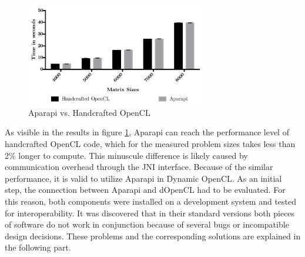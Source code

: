 \begin{figure}[H]
	\includegraphics[width=0.7\textwidth]{images/aparapivsopencl.pdf}
	\centering
	\caption{Aparapi vs. Handcrafted OpenCL}
	\label{img:aparapi_vs_opencl}
\end{figure}

As visible in the results in figure \ref{img:aparapi_vs_opencl}, Aparapi can reach the performance level of handcrafted OpenCL code, which for the measured problem sizes takes less than 2\% longer to compute. This minuscule difference is likely caused by communication overhead through the JNI interface. Because of the similar performance, it is valid to utilize Aparapi in Dynamic OpenCL. As an initial step, the connection between Aparapi and dOpenCL had to be evaluated. For this reason, both components were installed on a development system and tested for interoperability. It was discovered that in their standard versions both pieces of software do not work in conjunction because of several bugs or incompatible design decisions. These problems and the corresponding solutions are explained in the following part.

